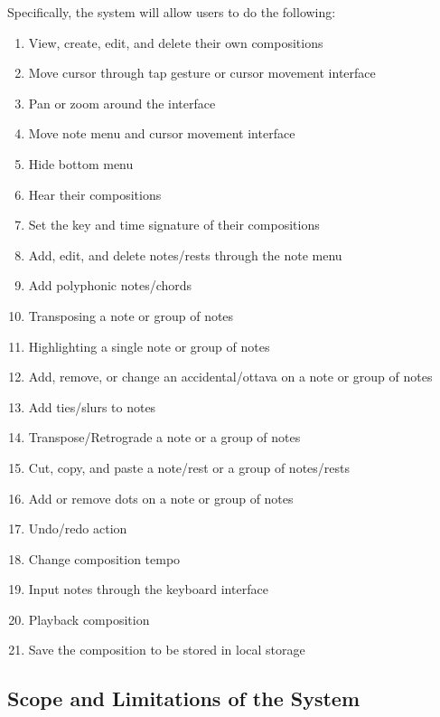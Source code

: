     	Specifically, the system will allow users to do the following: 
          \begin{enumerate}
              \item View, create, edit, and delete their own compositions
              \item Move cursor through tap gesture or cursor movement interface
              \item Pan or zoom around the interface
              \item Move note menu and cursor movement interface
              \item Hide bottom menu
              \item Hear their compositions
              \item Set the key and time signature of their compositions
              \item Add, edit, and delete notes/rests through the note menu
              \item Add polyphonic notes/chords
              \item Transposing a note or group of notes
              \item Highlighting a single note or group of notes
              \item Add, remove, or change an accidental/ottava on a note or group of notes
              \item Add ties/slurs to notes
              \item Transpose/Retrograde a note or a group of notes
              \item Cut, copy, and paste a note/rest or a group of notes/rests
              \item Add or remove dots on a note or group of notes
              \item Undo/redo action
              \item Change composition tempo
              \item Input notes through the keyboard interface
              \item Playback composition
              \item Save the composition to be stored in local storage    

          \end{enumerate}
    
\subsection{Scope and Limitations of the System}

